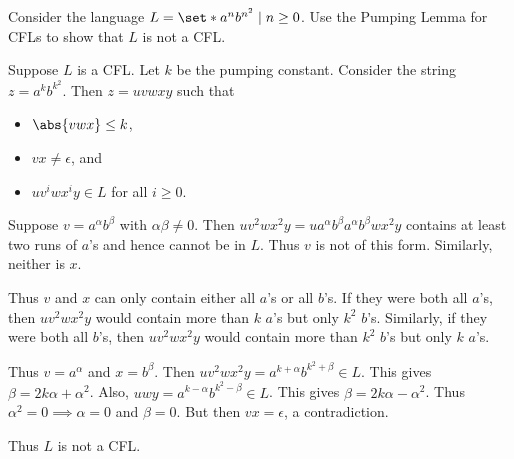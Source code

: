 \documentclass[12pt]{article}
\begin{document}
\begin{problem*}
    Consider the language $L = \set*{a^nb^{n^2} \mid n \ge 0}$.
    Use the Pumping Lemma for CFLs to show that $L$ is not a CFL. 
\end{problem*}
\begin{solution}
    Suppose $L$ is a CFL.
    Let $k$ be the pumping constant.
    Consider the string $z = a^kb^{k^2}$.
    Then $z = uvwxy$ such that
    \begin{itemize}
        \item $\abs{vwx} \le k$,
        \item $vx \ne \epsilon$, and
        \item $uv^iwx^iy \in L$ for all $i \ge 0$.
    \end{itemize}
    Suppose $v = a^\alpha b^\beta$ with $\alpha \beta \ne 0$.
    Then $uv^2wx^2y = ua^{\alpha} b^{\beta} a^{\alpha} b^{\beta} wx^2y$
    contains at least two runs of $a$'s and hence cannot be in $L$.
    Thus $v$ is not of this form.
    Similarly, neither is $x$.

    Thus $v$ and $x$ can only contain either all $a$'s or all $b$'s.
    If they were both all $a$'s, then $uv^2wx^2y$ would contain more than
    $k$ $a$'s but only $k^2$ $b$'s.
    Similarly, if they were both all $b$'s, then $uv^2wx^2y$ would contain
    more than $k^2$ $b$'s but only $k$ $a$'s.

    Thus $v = a^\alpha$ and $x = b^\beta$.
    Then $uv^2wx^2y = a^{k + \alpha} b^{k^2 + \beta} \in L$.
    This gives $\beta = 2k\alpha + \alpha^2$.
    Also, $uwy = a^{k - \alpha} b^{k^2 - \beta} \in L$.
    This gives $\beta = 2k\alpha - \alpha^2$.
    Thus $\alpha^2 = 0 \implies \alpha = 0$ and $\beta = 0$.
    But then $vx = \epsilon$, a contradiction.

    Thus $L$ is not a CFL.
\end{solution}
\end{document}
